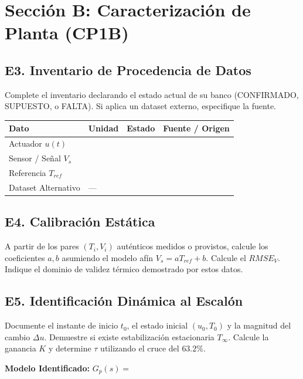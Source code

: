 \documentclass[11pt, a4paper]{article}
\begin{document}
\section*{Sección B: Caracterización de Planta (CP1B)}

\subsection*{E3. Inventario de Procedencia de Datos}
Complete el inventario declarando el estado actual de su banco (CONFIRMADO, SUPUESTO, o FALTA). Si aplica un dataset externo, especifique la fuente.
\begin{center}
\begin{tabularx}{\textwidth}{@{}l l X X@{}}
\toprule
\textbf{Dato} & \textbf{Unidad} & \textbf{Estado} & \textbf{Fuente / Origen} \\ \midrule
Actuador $u(t)$ & & & \\ \addlinespace[10pt]
Sensor / Señal $V_s$ & & & \\ \addlinespace[10pt]
Referencia $T_{ref}$ & & & \\ \addlinespace[10pt]
Dataset Alternativo & --- & & \\ \bottomrule
\end{tabularx}
\end{center}

\subsection*{E4. Calibración Estática}
A partir de los pares $(T_i, V_i)$ auténticos medidos o provistos, calcule los coeficientes $a, b$ asumiendo el modelo afín $V_s = aT_{ref} + b$. Calcule el $RMSE_V$. Indique el dominio de validez térmico demostrado por estos datos. \vspace{4cm}

\subsection*{E5. Identificación Dinámica al Escalón}
Documente el instante de inicio $t_0$, el estado inicial $(u_0, T_0)$ y la magnitud del cambio $\Delta u$. Demuestre si existe estabilización estacionaria $T_\infty$. Calcule la ganancia $K$ y determine $\tau$ utilizando el cruce del $63.2\%$. \vspace{4cm}

\noindent \textbf{Modelo Identificado:} $G_p(s) =$ \vspace{1cm}
\end{document}

